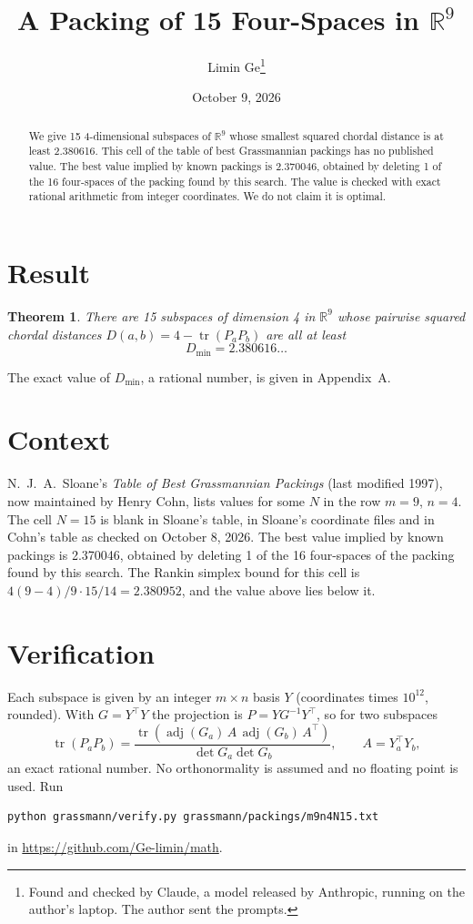 \documentclass[11pt,a4paper]{article}
\title{A Packing of 15 Four-Spaces in $\mathbb{R}^{9}$}
\author{Limin Ge\thanks{Found and checked by Claude, a model released by Anthropic, running on the author's laptop. The author sent the prompts.}}
\date{October 9, 2026}
\newtheorem*{theorem}{Theorem}
\begin{document}
\maketitle
\begin{abstract}
We give 15 4-dimensional subspaces of $\mathbb{R}^{9}$ whose smallest squared chordal distance is at least 2.380616. This cell of the table of best Grassmannian packings has no published value. The best value implied by known packings is 2.370046, obtained by deleting 1 of the 16 four-spaces of the packing found by this search. The value is checked with exact rational arithmetic from integer coordinates. We do not claim it is optimal.
\end{abstract}

\section{Result}
\begin{theorem}
There are 15 subspaces of dimension 4 in $\mathbb{R}^{9}$ whose pairwise squared chordal distances $D(a,b) = 4 - \operatorname{tr}(P_aP_b)$ are all at least
\[ D_{\min} = 2.380616\ldots \]
\end{theorem}
The exact value of $D_{\min}$, a rational number, is given in Appendix~A.


\section{Context}
N.~J.~A.~Sloane's \emph{Table of Best Grassmannian Packings} (last modified 1997), now maintained by Henry Cohn, lists values for some $N$ in the row $m=9$, $n=4$. The cell $N=15$ is blank in Sloane's table, in Sloane's coordinate files and in Cohn's table as checked on October 8, 2026. The best value implied by known packings is 2.370046, obtained by deleting 1 of the 16 four-spaces of the packing found by this search. The Rankin simplex bound for this cell is $4(9-4)/9\cdot 15/14 = 2.380952$, and the value above lies below it.


\section{Verification}
Each subspace is given by an integer $m\times n$ basis $Y$ (coordinates times $10^{12}$, rounded). With $G=Y^\top Y$ the projection is $P=YG^{-1}Y^\top$, so for two subspaces
\[ \operatorname{tr}(P_aP_b)=\frac{\operatorname{tr}(\operatorname{adj}(G_a)\,A\,\operatorname{adj}(G_b)\,A^\top)}{\det G_a\det G_b},\qquad A=Y_a^\top Y_b, \]
an exact rational number. No orthonormality is assumed and no floating point is used. Run
\begin{verbatim}
python grassmann/verify.py grassmann/packings/m9n4N15.txt
\end{verbatim}
in \url{https://github.com/Ge-limin/math}.
\end{document}

